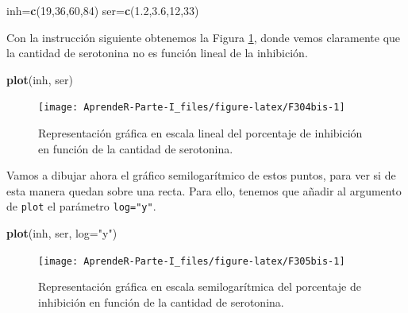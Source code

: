 \documentclass[]{book}
\newenvironment{Shaded}{\begin{snugshade}}{\end{snugshade}}
\newcommand{\DataTypeTok}[1]{\textcolor[rgb]{0.13,0.29,0.53}{#1}}
\newcommand{\DecValTok}[1]{\textcolor[rgb]{0.00,0.00,0.81}{#1}}
\newcommand{\FloatTok}[1]{\textcolor[rgb]{0.00,0.00,0.81}{#1}}
\newcommand{\KeywordTok}[1]{\textcolor[rgb]{0.13,0.29,0.53}{\textbf{#1}}}
\newcommand{\NormalTok}[1]{#1}
\newcommand{\StringTok}[1]{\textcolor[rgb]{0.31,0.60,0.02}{#1}}
\theoremstyle{definition}
\theoremstyle{definition}
\theoremstyle{definition}
\theoremstyle{remark}
\begin{document}
\begin{Shaded}
\begin{Highlighting}[]
\NormalTok{inh=}\KeywordTok{c}\NormalTok{(}\DecValTok{19}\NormalTok{,}\DecValTok{36}\NormalTok{,}\DecValTok{60}\NormalTok{,}\DecValTok{84}\NormalTok{)}
\NormalTok{ser=}\KeywordTok{c}\NormalTok{(}\FloatTok{1.2}\NormalTok{,}\FloatTok{3.6}\NormalTok{,}\DecValTok{12}\NormalTok{,}\DecValTok{33}\NormalTok{)}
\end{Highlighting}
\end{Shaded}

Con la instrucción siguiente obtenemos la Figura \ref{fig:F304bis}, donde vemos claramente que la cantidad de serotonina no es función lineal de la inhibición.

\begin{Shaded}
\begin{Highlighting}[]
\KeywordTok{plot}\NormalTok{(inh, ser)}
\end{Highlighting}
\end{Shaded}

\begin{figure}

{\centering \texttt{[image: AprendeR-Parte-I\_files/figure-latex/F304bis-1]} 

}

\caption{Representación gráfica en escala lineal del porcentaje de inhibición en función de la cantidad de serotonina.}\label{fig:F304bis}
\end{figure}

Vamos a dibujar ahora el gráfico semilogarítmico de estos puntos, para ver si de esta manera quedan sobre una recta. Para ello, tenemos que añadir al argumento de \texttt{plot} el parámetro \texttt{log="y"}.

\begin{Shaded}
\begin{Highlighting}[]
\KeywordTok{plot}\NormalTok{(inh, ser, }\DataTypeTok{log=}\StringTok{"y"}\NormalTok{)}
\end{Highlighting}
\end{Shaded}

\begin{figure}

{\centering \texttt{[image: AprendeR-Parte-I\_files/figure-latex/F305bis-1]} 

}

\caption{Representación gráfica en escala semilogarítmica del porcentaje de inhibición en función de la cantidad de serotonina.}\label{fig:F305bis}
\end{figure}
\end{document}

